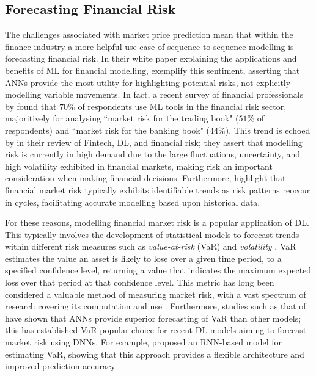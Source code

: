 \documentclass[a4paper, 11pt]{report}
\begin{document}
    \subsection{Forecasting Financial Risk}

    The challenges associated with market price prediction mean that within the finance industry a more helpful use case of sequence-to-sequence modelling is forecasting financial risk. In their white paper explaining the applications and benefits of ML for financial modelling, \citet{laplante-2019} exemplify this sentiment, asserting that ANNs provide the most utility for highlighting potential risks, not explicitly modelling variable movements. In fact, a recent survey of financial professionals by \citet{chartis-2019} found that $70\%$ of respondents use ML tools in the financial risk sector, majoritively for analysing ``market risk for the trading book" ($51\%$ of respondents) and ``market risk for the banking book" ($44\%$). This trend is echoed by \citet{peng-2021} in their review of Fintech, DL, and financial risk; they assert that modelling risk is currently in high demand due to the large fluctuations, uncertainty, and high volatility exhibited in financial markets, making risk an important consideration when making financial decisions. Furthermore, \citet{mashrur-2020} highlight that financial market risk typically exhibits identifiable trends as risk patterns reoccur in cycles, facilitating accurate modelling based upon historical data.

    For these reasons, modelling financial market risk is a popular application of DL. This typically involves the development of statistical models to forecast trends within different risk measures such as \emph{value-at-risk} (VaR) and \emph{volatility} \citep{peng-2021}. VaR estimates the value an asset is likely to lose over a given time period, to a specified confidence level, returning a value that indicates the maximum expected loss over that period at that confidence level. This metric has long been considered a valuable method of measuring market risk, with a vast spectrum of research covering its computation and use \citep{khindanova-2000}. Furthermore, studies such as that of \citet{sun-2009} have shown that ANNs provide superior forecasting of VaR than other models; this has established VaR popular choice for recent DL models aiming to forecast market risk using DNNs. For example, \citet{du-2019} proposed an RNN-based model for estimating VaR, showing that this approach provides a flexible architecture and improved prediction accuracy.
\end{document}
